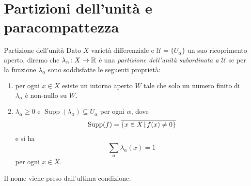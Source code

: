 \documentclass[a4paper]{article}
\begin{document}
\section{Partizioni dell'unità e paracompattezza}

\begin{snippetdefinition}{Partizione dell'unità}
    Dato \(X\) varietà differenziale e \(\mathcal U = \{U_\alpha\}\)
    un suo ricoprimento aperto, diremo che \(\lambda_\alpha \colon X \to \mathbb{R}\)
    è una \emph{partizione dell'unità subordinata a \(\mathcal U\)}
    se per la funzione \(\lambda_\alpha\) sono soddisfatte le seguenti
    proprietà: \begin{enumerate}
        \item per ogni \(x \in X\) esiste un intorno aperto \(W\)
        tale che solo un numero finito di \(\lambda_\alpha\) è non-nullo
        su \(W\).
        \item \(\lambda_\alpha \geq 0\) e \(\operatorname{Supp}(\lambda_\alpha) \subseteq U_\alpha\)
        per ogni \(\alpha\), dove \[
            \operatorname{Supp}(f) = \overline{\left\{x \in X \,|\, f(x) \neq 0\right\}}
        \]
        e si ha \[
            \sum_\alpha \lambda_\alpha(x) = 1
        \]
        per ogni \(x \in X\).
    \end{enumerate}
\end{snippetdefinition}

Il nome viene preso dall'ultima condizione.
\end{document}
